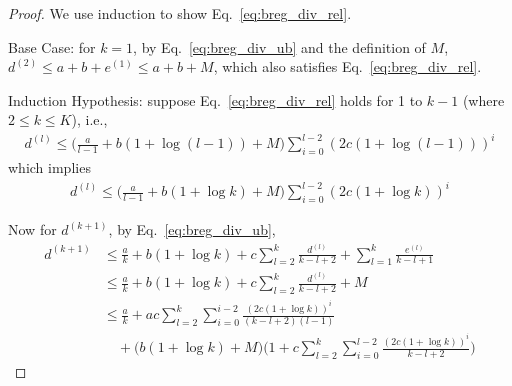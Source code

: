 \begin{proof}
    We use induction to show Eq.~\ref{eq:breg_div_rel}. 
    
    Base Case: for $k = 1$, 
    by Eq.~\ref{eq:breg_div_ub} and the definition of $M$,
    $d^{(2)}\leq a+b + e^{(1)} \leq a + b + M$, which also satisfies Eq.~\ref{eq:breg_div_rel}.

    Induction Hypothesis: suppose Eq.~\ref{eq:breg_div_rel} holds for 1 to $k-1$ (where $2 \leq k \leq K$), i.e., 
    \begin{align}
        d^{(l)} \leq \Big(\frac{a}{l-1} + b(1+\log (l-1)) + M \Big)\sum_{i=0}^{l-2} (2c(1+\log (l-1)))^{i}
    \end{align}
    which implies
    \begin{align}
        d^{(l)} \leq \Big(\frac{a}{l-1} + b(1+\log k) + M \Big)\sum_{i=0}^{l-2} (2c(1+\log k))^{i}
    \end{align}

    Now for $d^{(k+1)}$, by Eq.~\ref{eq:breg_div_ub},
    \begin{align}
        d^{(k+1)} &\leq \frac{a}{k} + b(1+\log k) + c\sum_{l=2}^{k} \frac{d^{(l)}}{k-l+2} + \sum_{l=1}^{k} \frac{e^{(l)}}{k-l+1}\\
        &\leq \frac{a}{k} + b(1+\log k) + c\sum_{l=2}^{k} \frac{d^{(l)}}{k-l+2} + M\\
    \label{eq:breg_div_rel_interm1}
        &\leq \frac{a}{k} + ac \sum_{l=2}^{k} \sum_{i=0}^{i-2} \frac{(2c(1+\log k))^i}{(k-l+2) (l-1)} \\
        \nonumber
        &\quad + \Big( b(1+\log k) + M \Big) \Big(1 + c \sum_{l=2}^{k} \sum_{i=0}^{l-2} \frac{(2c(1+\log k))^i}{k-l+2} \Big)
    \end{align}


\end{proof}
